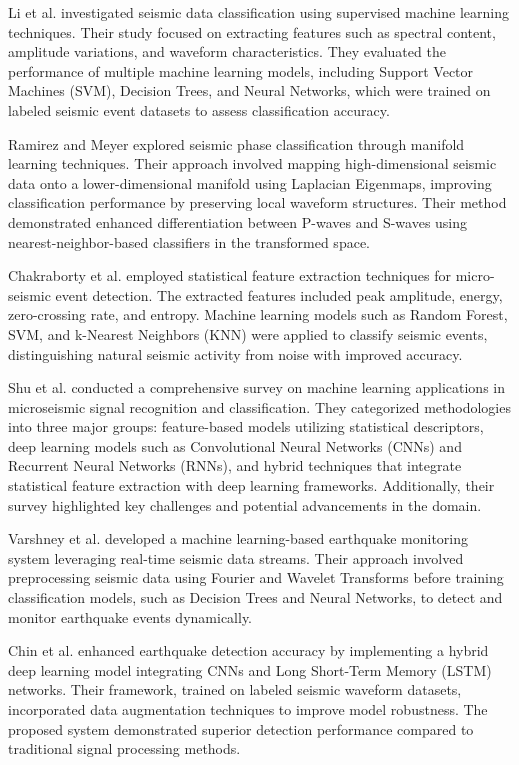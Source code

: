 \documentclass[conference]{IEEEtran}
\begin{document}
Li et al. \cite{b1} investigated seismic data
classification using supervised machine learning techniques. Their study focused
on extracting features such as spectral content, amplitude variations, and
waveform characteristics. They evaluated the performance of multiple machine
learning models, including Support Vector Machines (SVM), Decision Trees, and
Neural Networks, which were trained on labeled seismic event datasets to assess
classification accuracy.


Ramirez and Meyer \cite{b2} explored seismic phase
classification through manifold learning techniques. Their approach involved
mapping high-dimensional seismic data onto a lower-dimensional manifold using
Laplacian Eigenmaps, improving classification performance by preserving local
waveform structures. Their method demonstrated enhanced differentiation between
P-waves and S-waves using nearest-neighbor-based classifiers in the transformed
space.


Chakraborty et al. \cite{b3} employed statistical feature extraction
techniques for micro-seismic event detection. The extracted features included
peak amplitude, energy, zero-crossing rate, and entropy. Machine learning models
such as Random Forest, SVM, and k-Nearest Neighbors (KNN) were applied to
classify seismic events, distinguishing natural seismic activity from noise with
improved accuracy.


Shu et al. \cite{b4} conducted a comprehensive survey on
machine learning applications in microseismic signal recognition and
classification. They categorized methodologies into three major groups:
feature-based models utilizing statistical descriptors, deep learning models
such as Convolutional Neural Networks (CNNs) and Recurrent Neural Networks
(RNNs), and hybrid techniques that integrate statistical feature extraction with
deep learning frameworks. Additionally, their survey highlighted key challenges
and potential advancements in the domain.


Varshney et al. \cite{b5} developed a
machine learning-based earthquake monitoring system leveraging real-time seismic
data streams. Their approach involved preprocessing seismic data using Fourier
and Wavelet Transforms before training classification models, such as Decision
Trees and Neural Networks, to detect and monitor earthquake events dynamically.


Chin et al. \cite{b6} enhanced earthquake detection accuracy by implementing a
hybrid deep learning model integrating CNNs and Long Short-Term Memory (LSTM)
networks. Their framework, trained on labeled seismic waveform datasets,
incorporated data augmentation techniques to improve model robustness. The
proposed system demonstrated superior detection performance compared to
traditional signal processing methods.
\end{document}
